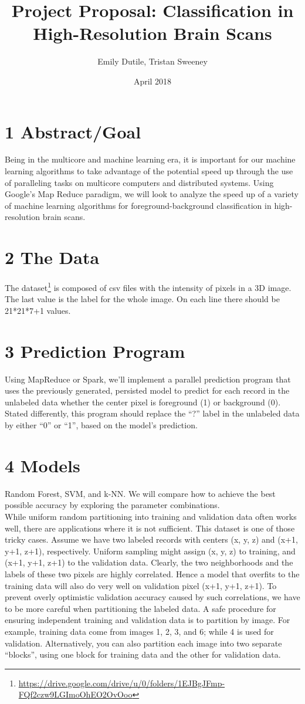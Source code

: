 \documentclass{neu_handout}
\title{Project Proposal: Classification in High-Resolution Brain Scans}
\author{Emily Dutile, Tristan Sweeney}
\date{April 2018}
\begin{document}
\section*{1 Abstract/Goal}
Being in the multicore and machine learning era, it is important for our machine learning algorithms to take advantage of the potential speed up through the use of paralleling tasks on multicore computers and distributed systems. Using Google's Map Reduce paradigm, we will look to analyze the speed up of a variety of machine learning algorithms for foreground-background classification in high-resolution brain scans.

\section*{2 The Data}
The dataset\footnote{\url{https://drive.google.com/drive/u/0/folders/1EJBgJFmp-FQf2czw9LGImoOhEO2OvOoo}} is composed of csv files with the intensity of pixels in a 3D image.  The last value is the label for the whole image. On each line there should be 21*21*7+1 values.

\section*{3 Prediction Program}
Using MapReduce or Spark, we'll implement a parallel prediction program that uses the previously generated, persisted model to predict for each record in the unlabeled data whether the center pixel is foreground (1) or background (0). Stated differently, this program should replace the “?” label in the unlabeled data by either “0” or “1”, based on the model’s prediction.

\section*{4 Models}
Random Forest, SVM, and k-NN. We will compare how to achieve the best possible accuracy by exploring the parameter combinations.\\

While uniform random partitioning into training and validation data often works well, there are
applications where it is not sufficient. This dataset is one of those tricky cases. Assume we have two labeled
records with centers (x, y, z) and (x+1, y+1, z+1), respectively. Uniform sampling might assign (x, y, z) to
training, and (x+1, y+1, z+1) to the validation data. Clearly, the two neighborhoods and the labels of
these two pixels are highly correlated. Hence a model that overfits to the training data will also do very
well on validation pixel (x+1, y+1, z+1). To prevent overly optimistic validation accuracy caused by such
correlations, we have to be more careful when partitioning the labeled data. A safe procedure for 
ensuring independent training and validation data is to partition by image. For example, training data
come from images 1, 2, 3, and 6; while 4 is used for validation. Alternatively, you can also partition each
image into two separate “blocks”, using one block for training data and the other for validation data.\\
\end{document}

